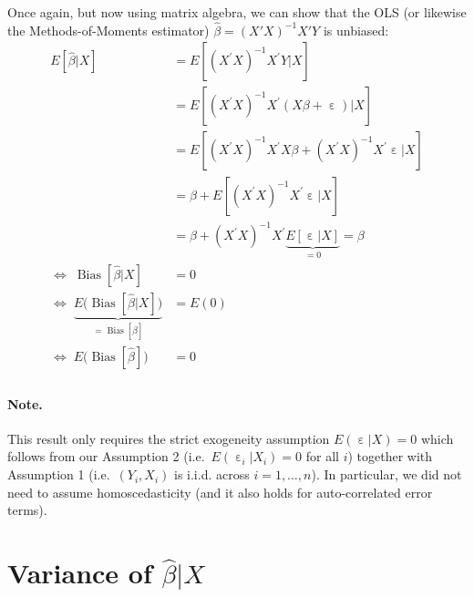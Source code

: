 \documentclass[
  14pt,
]{memoir}
\DeclareMathOperator{\eps}{\varepsilon}
\begin{document}
Once again, but now using matrix algebra, we can show that the OLS (or likewise the Methods-of-Moments estimator) \(\hat\beta = \left(X'X\right)^{-1}X'Y\) is unbiased:
\begin{align*}
E[\hat{\beta}|X]
&=E\left[\left(X^{\prime} X\right)^{-1} X^{\prime} Y|X\right]\\
&=E\left[\left(X^{\prime} X\right)^{-1} X^{\prime}(X \beta+\eps)|X\right] \\
&=E\left[\left(X^{\prime} X\right)^{-1} X^{\prime} X \beta+\left(X^{\prime} X\right)^{-1} X^{\prime} \eps|X\right] \\
&=\beta+E\left[\left(X^{\prime} X\right)^{-1} X^{\prime} \eps|X\right] \\
&=\beta+\left(X^{\prime} X\right)^{-1} X^{\prime}\underbrace{E[\eps|X]}_{=0}=\beta\\
\Leftrightarrow\;\operatorname{Bias}[\hat{\beta}|X]&=0\\
\Leftrightarrow\;\underbrace{E\big(\operatorname{Bias}[\hat{\beta}|X]\big)}_{=\operatorname{Bias}[\hat{\beta}]}&=E(0)\\
\Leftrightarrow\;E\big(\operatorname{Bias}[\hat{\beta}]\big)&=0\\
\end{align*}

\paragraph*{Note.}

This result only requires the strict exogeneity assumption \(E(\eps|X)=0\) which follows from our Assumption 2 (i.e.~\(E(\eps_i|X_i)=0\) for all \(i\)) together with Assumption 1 (i.e.~\((Y_i,X_i)\) is i.i.d. across \(i=1,\dots,n\)). In particular, we did not need to assume homoscedasticity (and it also holds for auto-correlated error terms).

\hypertarget{ch:VarEstBeta}{%
\section{\texorpdfstring{Variance of \(\hat\beta|X\)}{Variance of \textbackslash hat\textbackslash beta\textbar X}}\label{ch:VarEstBeta}}
\end{document}
